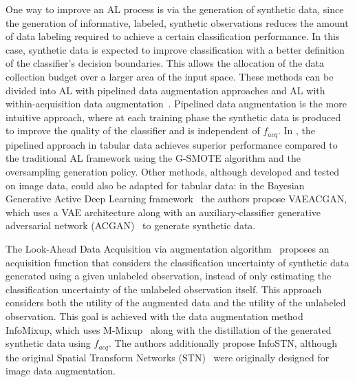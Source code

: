 One way to improve an AL process is via the generation of synthetic data,
since the generation of informative, labeled, synthetic observations reduces the amount
of data labeling required to achieve a certain classification performance. In
this case, synthetic data is expected to improve classification with a better
definition of the classifier's decision boundaries. This allows the allocation
of the data collection budget over a larger area of the input space. These
methods can be divided into AL with pipelined data augmentation approaches and
AL with within-acquisition data augmentation~\cite{Kim2021}. Pipelined
data augmentation is the more intuitive approach, where at each training phase
the synthetic data is produced to improve the quality of the classifier and is
independent of $f_{acq}$. In \cite{Fonseca2021al}, the pipelined
approach in tabular data achieves superior performance compared to the
traditional AL framework using the G-SMOTE algorithm and the oversampling
generation policy. Other methods, although developed and tested on image data,
could also be adapted for tabular data: in the Bayesian Generative Active Deep
Learning framework~\cite{tran2019bayesian} the authors propose VAEACGAN, which
uses a VAE architecture along with an auxiliary-classifier generative
adversarial network (ACGAN)~\cite{odena2017conditional} to generate synthetic
data.

The Look-Ahead Data Acquisition via augmentation algorithm~\cite{Kim2021}
proposes an acquisition function that considers the classification uncertainty
of synthetic data generated using a given unlabeled observation, instead of
only estimating the classification uncertainty of the unlabeled observation
itself. This approach considers both the utility of the augmented data and the
utility of the unlabeled observation. This goal is achieved with the data
augmentation method InfoMixup, which uses M-Mixup~\cite{verma2019manifold}
along with the distillation of the generated synthetic data using $f_{acq}$.
The authors additionally propose InfoSTN, although the original Spatial
Transform Networks (STN)~\cite{jaderberg2015spatial} were originally designed
for image data augmentation.


% 
% 
% 
% 

